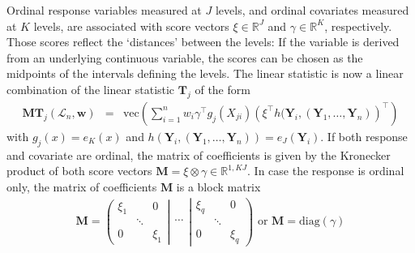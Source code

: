 \documentclass{Z}
\newcommand{\R}{\mathbb{R} }
\newcommand{\LS}{\mathcal{L}_n}
\newcommand{\Y}{\mathbf{Y}}
\newcommand{\T}{\mathbf{T}}
\newcommand{\w}{\mathbf{w}}
\newcommand{\M}{\mathbf{M}}
\renewcommand{\vec}{\text{vec}}
\begin{document}
Ordinal response variables measured at $J$ levels, and ordinal covariates
measured at $K$ levels, are associated with score vectors $\xi \in
\R^J$ and $\gamma \in \R^K$, respectively. Those scores reflect the
`distances' between the levels: If the variable is derived from an
underlying continuous variable, the scores can be chosen as the midpoints
of the intervals defining the levels. The linear statistic is now a linear
combination of the linear statistic $\T_j$ of the form
\begin{eqnarray*}
\M \T_j(\LS, \w) & = & \vec \left( \sum_{i=1}^n w_i \gamma^\top g_j(X_{ji})
            \left(\xi^\top h(\Y_i, (\Y_1, \dots, \Y_n)\right)^\top \right)
\end{eqnarray*}
with $g_j(x) = e_K(x)$ and $h(\Y_i, (\Y_1, \dots, \Y_n)) = e_J(\Y_i)$.
If both response and covariate are ordinal, the matrix of coefficients
is given by the Kronecker product of both score vectors $\M = \xi \otimes \gamma \in
\R^{1, KJ}$. In case the response is ordinal only, the matrix of 
coefficients $\M$ is a block matrix 
\begin{eqnarray*}
\M = 
\left( 
    \begin{array}{ccc}
        \xi_1 &          & 0     \\
              &  \ddots  &       \\
          0   &          & \xi_1 
    \end{array} \right| 
    \begin{array}{c}
         \\
      \hdots \\
          \\
    \end{array} %
\left|
    \begin{array}{ccc}
        \xi_q &          & 0     \\
              &  \ddots  &       \\
          0   &          & \xi_q 
    \end{array} 
\right) 
\text{ or } %
\M = \text{diag}(\gamma)
\end{eqnarray*}
\end{document}
